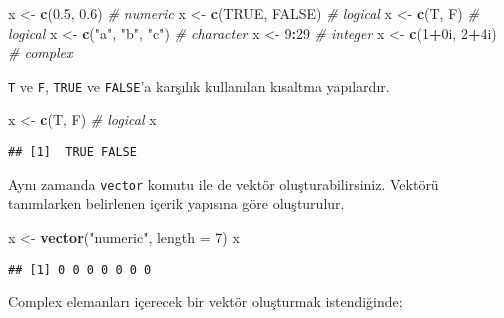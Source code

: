 \documentclass[
]{book}
\newenvironment{Shaded}{\begin{snugshade}}{\end{snugshade}}
\newcommand{\CommentTok}[1]{\textcolor[rgb]{0.56,0.35,0.01}{\textit{#1}}}
\newcommand{\DataTypeTok}[1]{\textcolor[rgb]{0.13,0.29,0.53}{#1}}
\newcommand{\DecValTok}[1]{\textcolor[rgb]{0.00,0.00,0.81}{#1}}
\newcommand{\FloatTok}[1]{\textcolor[rgb]{0.00,0.00,0.81}{#1}}
\newcommand{\KeywordTok}[1]{\textcolor[rgb]{0.13,0.29,0.53}{\textbf{#1}}}
\newcommand{\NormalTok}[1]{#1}
\newcommand{\OperatorTok}[1]{\textcolor[rgb]{0.81,0.36,0.00}{\textbf{#1}}}
\newcommand{\OtherTok}[1]{\textcolor[rgb]{0.56,0.35,0.01}{#1}}
\newcommand{\StringTok}[1]{\textcolor[rgb]{0.31,0.60,0.02}{#1}}
\begin{document}
\begin{Shaded}
\begin{Highlighting}[]
\NormalTok{x <-}\StringTok{ }\KeywordTok{c}\NormalTok{(}\FloatTok{0.5}\NormalTok{, }\FloatTok{0.6}\NormalTok{) }\CommentTok{# numeric }
\NormalTok{x <-}\StringTok{ }\KeywordTok{c}\NormalTok{(}\OtherTok{TRUE}\NormalTok{, }\OtherTok{FALSE}\NormalTok{) }\CommentTok{# logical}
\NormalTok{x <-}\StringTok{ }\KeywordTok{c}\NormalTok{(T, F) }\CommentTok{# logical}
\NormalTok{x <-}\StringTok{ }\KeywordTok{c}\NormalTok{(}\StringTok{"a"}\NormalTok{, }\StringTok{"b"}\NormalTok{, }\StringTok{"c"}\NormalTok{) }\CommentTok{# character}
\NormalTok{x <-}\StringTok{ }\DecValTok{9}\OperatorTok{:}\DecValTok{29} \CommentTok{# integer}
\NormalTok{x <-}\StringTok{ }\KeywordTok{c}\NormalTok{(}\DecValTok{1}\OperatorTok{+}\NormalTok{0i, }\DecValTok{2}\OperatorTok{+}\NormalTok{4i) }\CommentTok{# complex}
\end{Highlighting}
\end{Shaded}

\texttt{T} ve \texttt{F}, \texttt{TRUE} ve \texttt{FALSE}'a karşılık kullanılan kısaltma yapılardır.

\begin{Shaded}
\begin{Highlighting}[]
\NormalTok{x <-}\StringTok{ }\KeywordTok{c}\NormalTok{(T, F) }\CommentTok{# logical}
\NormalTok{x}
\end{Highlighting}
\end{Shaded}

\begin{verbatim}
## [1]  TRUE FALSE
\end{verbatim}

Aynı zamanda \texttt{vector} komutu ile de vektör oluşturabilirsiniz. Vektörü tanımlarken belirlenen içerik yapısına göre oluşturulur.

\begin{Shaded}
\begin{Highlighting}[]
\NormalTok{x <-}\StringTok{ }\KeywordTok{vector}\NormalTok{(}\StringTok{"numeric"}\NormalTok{, }\DataTypeTok{length =} \DecValTok{7}\NormalTok{)}
\NormalTok{x}
\end{Highlighting}
\end{Shaded}

\begin{verbatim}
## [1] 0 0 0 0 0 0 0
\end{verbatim}

Complex elemanları içerecek bir vektör oluşturmak istendiğinde;
\end{document}
